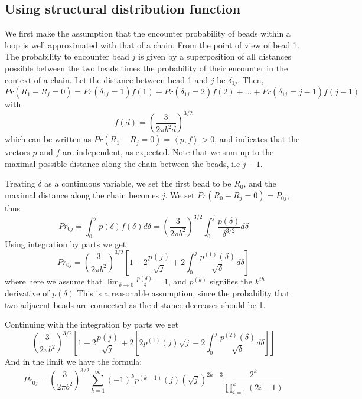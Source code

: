 \documentclass[12pt]{article}
\begin{document}
\subsection{Using structural distribution function}
We first make the assumption that the encounter probability of beads within a loop is well approximated with that of a chain. From the point of view of bead 1. The probability to encounter bead $j$ is given by a superposition of all distances possible between the two beads times the probability of their encounter in the context of a chain. Let the distance between bead 1 and $j$ be $\delta_{1j}$. Then,
\begin{equation*}
Pr(R_1-R_j=0)=Pr(\delta_{1j}=1)f(1)+Pr(\delta_{1j}=2)f(2)+...+Pr(\delta_{1j}=j-1)f(j-1)
\end{equation*}
with 
\begin{equation*}
f(d) = \left(\frac{3}{2\pi b^2 d}\right)^{3/2}
\end{equation*}
which can be written as $Pr(R_1-R_j=0)=\left<p,f\right> >0$, and indicates that the vectors $p$ and $f$ are independent, as expected. Note that we sum up to the maximal possible distance along the chain between the beads, i.e $j-1$.

Treating $\delta$ as a continuous variable, we set the first bead to be $R_0$, and the maximal distance along the chain becomes $j$. We set $Pr(R_0-R_j=0)=P_{0j}$, thus
\begin{equation*}
Pr_{0j}= \int_{0}^{j} p(\delta)f(\delta)d\delta= \left(\frac{3}{2\pi b^2}\right)^{3/2}\int_0^{j} \frac{p(\delta)}{\delta^{3/2}}d\delta
\end{equation*}
Using integration by parts we get 
\begin{equation}
Pr_{0j}=\left(\frac{3}{2\pi b^2}\right)^{3/2}\left[1 -2\frac{p(j)}{\sqrt{j}}+2\int_0^{j}\frac{p^{(1)}(\delta)}{\sqrt{\delta}}d\delta  \right]
\end{equation}
where here we assume that $\lim_{\delta\rightarrow 0}\frac{p(\delta)}{\delta}=1$, and $p^{(k)}$ signifies the $k^{th}$ derivative of $p(\delta)$
This is a reasonable assumption, since the probability that two adjacent beads are connected as the distance decreases should be 1. 

Continuing with the integration by parts we get 
\begin{equation*}
\left(\frac{3}{2\pi b^2}\right)^{3/2}\left[1 -2\frac{p(j)}{\sqrt{j}}+2[2p^{(1)}(j)\sqrt{j}-2\int_0^{j}\frac{p^{(2)}(\delta)}{\sqrt{\delta}}d\delta]  \right]
\end{equation*}
And in the limit we have the formula:
\begin{equation*}
Pr_{0j}=\left(\frac{3}{2\pi b^2}\right)^{3/2}\sum_{k=1}^\infty (-1)^k p^{(k-1)}(j)\left(\sqrt{j}\right)^{2k-3} \frac{2^k}{\prod_{i=1}^k (2i-1)}
\end{equation*} 
\end{document}
